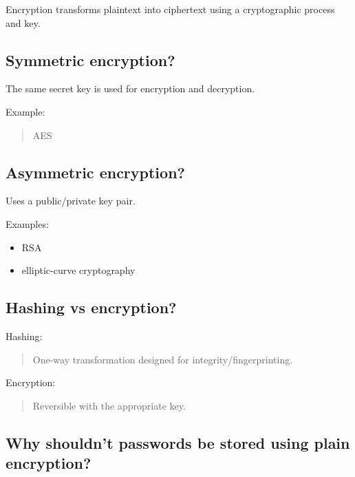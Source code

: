 Encryption transforms plaintext into ciphertext using a cryptographic process and key.

\medskip

\subsection{Symmetric encryption?}

The same secret key is used for encryption and decryption.

Example:

\begin{quote}
AES\\
\end{quote}

\medskip

\subsection{Asymmetric encryption?}

Uses a public/private key pair.

Examples:

\begin{itemize}
  \item RSA
  \item elliptic-curve cryptography
\end{itemize}

\medskip

\subsection{Hashing vs encryption?}

Hashing:

\begin{quote}
One-way transformation designed for integrity/fingerprinting.\\
\end{quote}

Encryption:

\begin{quote}
Reversible with the appropriate key.\\
\end{quote}

\medskip

\subsection{Why shouldn't passwords be stored using plain encryption?}

